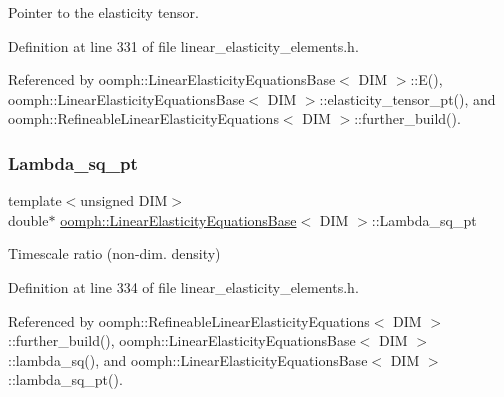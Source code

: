 Pointer to the elasticity tensor. 



Definition at line 331 of file linear\+\_\+elasticity\+\_\+elements.\+h.



Referenced by oomph\+::\+Linear\+Elasticity\+Equations\+Base$<$ D\+I\+M $>$\+::\+E(), oomph\+::\+Linear\+Elasticity\+Equations\+Base$<$ D\+I\+M $>$\+::elasticity\+\_\+tensor\+\_\+pt(), and oomph\+::\+Refineable\+Linear\+Elasticity\+Equations$<$ D\+I\+M $>$\+::further\+\_\+build().

\mbox{\label{classoomph_1_1LinearElasticityEquationsBase_a2889063488b439d1ec746d20ac8b8f1f}} 
\subsubsection{\texorpdfstring{Lambda\+\_\+sq\+\_\+pt}{Lambda\_sq\_pt}}
{\footnotesize\ttfamily template$<$unsigned D\+IM$>$ \\
double$\ast$ \hyperlink{classoomph_1_1LinearElasticityEquationsBase}{oomph\+::\+Linear\+Elasticity\+Equations\+Base}$<$ D\+IM $>$\+::Lambda\+\_\+sq\+\_\+pt\hspace{0.3cm}{\ttfamily [protected]}}



Timescale ratio (non-\/dim. density) 



Definition at line 334 of file linear\+\_\+elasticity\+\_\+elements.\+h.



Referenced by oomph\+::\+Refineable\+Linear\+Elasticity\+Equations$<$ D\+I\+M $>$\+::further\+\_\+build(), oomph\+::\+Linear\+Elasticity\+Equations\+Base$<$ D\+I\+M $>$\+::lambda\+\_\+sq(), and oomph\+::\+Linear\+Elasticity\+Equations\+Base$<$ D\+I\+M $>$\+::lambda\+\_\+sq\+\_\+pt().

\mbox{\label{classoomph_1_1LinearElasticityEquationsBase_ab90306067812bca9a8dc63b6dacf1355}} 
